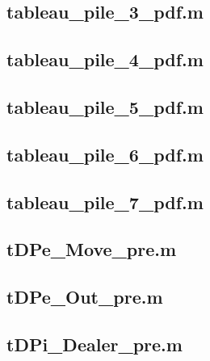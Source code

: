 \documentclass[runningheads,a4paper]{llncs}
\newcommand{\GPenSIM}{../GPenSIM}
\begin{document}
\subsection{tableau\_pile\_3\_pdf.m}
\label{app:tableau_pile_3_pdf}


\subsection{tableau\_pile\_4\_pdf.m}
\label{app:tableau_pile_4_pdf}


\subsection{tableau\_pile\_5\_pdf.m}
\label{app:tableau_pile_5_pdf}


\subsection{tableau\_pile\_6\_pdf.m}
\label{app:tableau_pile_6_pdf}


\subsection{tableau\_pile\_7\_pdf.m}
\label{app:tableau_pile_7_pdf}


\subsection{tDPe\_Move\_pre.m}
\label{app:tDPe_Move_pre}


\subsection{tDPe\_Out\_pre.m}
\label{app:tDPe_Out_pre}


\subsection{tDPi\_Dealer\_pre.m}
\label{app:tDPi_Dealer_pre}

\end{document}
